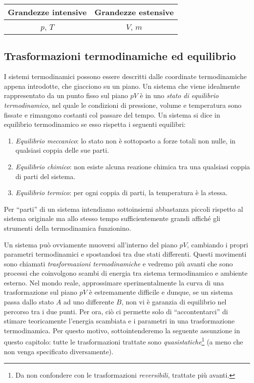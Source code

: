 \begin{center}
    \begin{tabular}{c || c}
        Grandezze intensive & Grandezze estensive\\
        \hline
        $p$, $T$ & $V$, $m$
    \end{tabular}
\end{center}


\subsection{Trasformazioni termodinamiche ed equilibrio}
I sistemi termodinamici possono essere descritti dalle coordinate
termodinamiche appena introdotte, che giacciono su un piano. Un
sistema che viene idealmente rappresentato da un punto fisso sul
piano $pV$ è in uno \textit{stato di equilibrio termodinamico},
nel quale le condizioni di pressione, volume e temperatura sono
fissate e rimangono costanti col passare del tempo.
Un sistema si dice in equilibrio termodinamico se esso rispetta i seguenti equilibri:
\begin{enumerate}
    \item \textit{Equilibrio meccanico}: lo stato non è sottoposto a forze totali non nulle,
    in qualsiasi coppia delle sue parti.

    \item \textit{Equilibrio chimico}: non esiste alcuna reazione chimica tra una qualsiasi
    coppia di parti del sistema.

    \item \textit{Equilibrio termico}: per ogni coppia di parti, la temperatura è la stessa.
\end{enumerate}

\noindent Per ``parti'' di un sistema intendiamo sottoinsiemi
abbastanza piccoli rispetto al sistema originale ma allo stesso
tempo sufficientemente grandi affiché gli strumenti della termodinamica
funzionino.


Un sistema può ovviamente muoversi all'interno del piano $pV$, cambiando
i propri parametri termodinamici e spostandosi tra due stati differenti.
Questi movimenti sono chiamati \textit{trasformazioni termodinamiche} e
vedremo più avanti che sono processi che coinvolgono scambi di energia
tra sistema termodinamico e ambiente esterno. Nel mondo reale, approssimare
sperimentalmente la curva di una trasformazione sul piano $pV$ è
estremamente difficile e dunque, se un sistema passa dallo stato $A$
ad uno differente $B$, non vi è garanzia di equilibrio nel percorso
tra i due punti. Per ora, ciò ci permette solo di ``accontentarci'' di
stimare teoricamente l'energia scambiata e i parametri in una trasformazione
termodinamica. Per questo motivo, sottointenderemo la seguente assunzione
in questo capitolo: tutte le trasformazioni trattate sono \textit{quasistatiche}\footnote{Da non confondere con le trasformazioni \textit{reversibili}, trattate più avanti.}
(a meno che non venga specificato diversamente).

